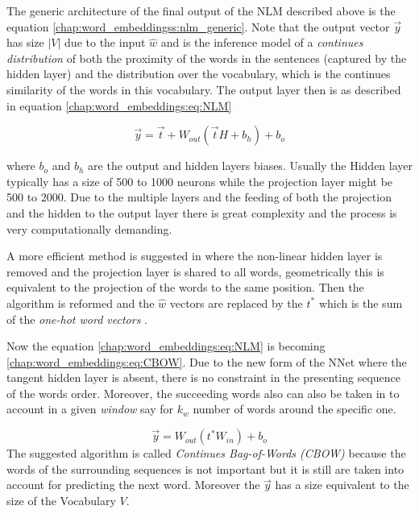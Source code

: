The generic architecture of the final output of the NLM described above is the equation \ref{chap:word_embeddingss:nlm_generic}. Note that the output vector $\vec{y}$ has size $|V|$ due to the input $\hat{w}$ and is the inference model of a \textit{continues distribution} of both the proximity of the words in the sentences (captured by the hidden layer) and the distribution over the vocabulary, which is the continues similarity of the words in this vocabulary. The output layer then is as described in equation \ref{chap:word_embeddings:eq:NLM}

\begin{equation} \label{chap:word_embeddings:eq:NLM}
	\vec{y} = \vec{t} + W_{out}(\vec{t}H + b_{h}) + b_{o}
\end{equation}

\noindent
where $b_{o}$ and $b_{h}$ are the output and hidden layers biases. Usually the Hidden layer typically has a size of 500 to 1000 neurons while the projection layer might be 500 to 2000. Due to the multiple layers and the feeding of both the projection and the hidden to the output layer there is great complexity and the process is very computationally demanding. 

A more efficient method is suggested in \parencite{mikolov2013efficient} where the non-linear hidden layer is removed and the projection layer is shared to all words, geometrically this is equivalent to the projection of the words to the same position. Then the algorithm is reformed and the $\hat{w}$ vectors are replaced by the $t^{*}$ which is the sum of the \textit{one-hot word vectors} \parencite{mitra2018introduction}. 

Now the equation \ref{chap:word_embeddings:eq:NLM} is becoming \ref{chap:word_embeddings:eq:CBOW}. Due to the new form of the NNet where the tangent hidden layer is absent, there is no constraint in the presenting sequence of the words order. Moreover, the succeeding words also can also be taken in to account in a given \textit{window} say for $k_{w}$ number of words around the specific one. 

\begin{equation} \label{chap:word_embeddings:eq:CBOW}
	\vec{y} = W_{out}(t^{*}W_{in}) + b_{o}
\end{equation}
The suggested algorithm is called \textit{Continues Bag-of-Words (CBOW)} because the words of the surrounding sequences is not important but it is still are taken into account for predicting the next word. Moreover the $\vec{y}$ has a size equivalent to the size of the Vocabulary $V$. 

